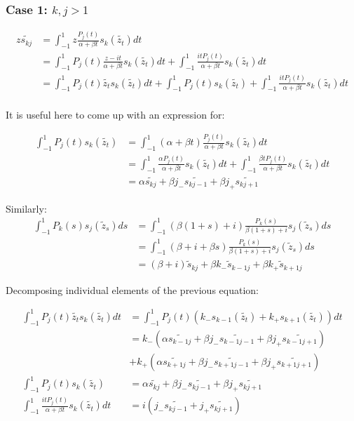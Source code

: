 \documentclass{article}
\begin{document}
\subsubsection{Case 1: $k,j>1$}

\begin{align}
	z\tilde{s_{kj}}&=\int_{-1}^1z\frac{P_j(t)}{\alpha+\beta t}s_k(\tilde{z_t})dt\\
	&=\int_{-1}^1P_j(t)\frac{z-it}{\alpha+\beta t}s_k(\tilde{z_t})dt
	+\int_{-1}^1\frac{itP_j(t)}{\alpha+\beta t}s_k(\tilde{z_t})dt\\
	&=\int_{-1}^1P_j(t)\tilde{z_t}s_k(\tilde{z_t})dt
	+\int_{-1}^1P_j(t)s_k(\tilde{z_t})
	+\int_{-1}^1\frac{itP_j(t)}{\alpha+\beta t}s_k(\tilde{z_t})dt\\
\end{align}

It is useful here to come up with an expression for:

\begin{align}
    \int_{-1}^1P_j(t)s_k(\tilde{z_t}) &= \int_{-1}^1(\alpha+\beta t)\frac{P_j(t)}{\alpha + \beta t} s_k(\tilde{z_t})dt\\
    &= \int_{-1}^1\frac{\alpha P_j(t)}{\alpha+\beta t}s_k(\tilde{z_t})dt+\int_{-1}^1\frac{\beta tP_j(t)}{\alpha+\beta t}s_k(\tilde{z_t})dt\\
    &= \alpha\tilde{s_{kj}} + \beta j_-\tilde{s_{kj-1}}+\beta j_+\tilde{s_{kj+1}}
\end{align}

Similarly:
\begin{align}
    \int_{-1}^1P_k(s)s_j(\tilde{z}_s)ds &= \int_{-1}^1(\beta(1+s)+i)\frac{P_k(s)}{\beta(1+s)+i}s_j(\tilde{z}_s)ds\\
    &=\int_{-1}^1(\beta+i+\beta s)\frac{P_k(s)}{\beta(1+s)+i}s_j(\tilde{z}_s)ds\\
    &=(\beta+i)\tilde{s}_{kj}+\beta k_-\tilde{s}_{k-1j}+\beta k_+\tilde{s}_{k+1j}
\end{align}

Decomposing individual elements of the previous equation:

\begin{align}
	\int_{-1}^1P_j(t)\tilde{z_t}s_k(\tilde{z_t})dt&=\int_{-1}^1P_j(t)(k_-s_{k-1}(\tilde{z_t})+k_+s_{k+1}(\tilde{z_t}))dt\\
	&= k_-(\alpha\tilde{s_{k-1j}}+\beta j_-\tilde{s_{k-1j-1}}+\beta j_+\tilde{s_{k-1j+1}})\\
	&+ k_+(\alpha\tilde{s_{k+1j}}+\beta j_-\tilde{s_{k+1j-1}}+\beta j_+\tilde{s_{k+1j+1}})\\
	\int_{-1}^1P_j(t)s_k(\tilde{z_t}) &= \alpha\tilde{s_{kj}} + \beta j_-\tilde{s_{kj-1}}+\beta j_+\tilde{s_{kj+1}}\\
	\int_{-1}^1\frac{itP_j(t)}{\alpha+\beta t}s_k(\tilde{z_t})dt &= i(j_-\tilde{s_{kj-1}}+j_+\tilde{s_{kj+1}})
\end{align}
\end{document}
